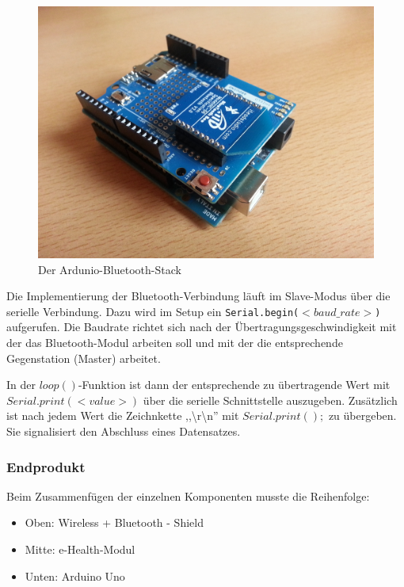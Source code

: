 \documentclass[10pt, a4paper, oneside, titlepage]{scrartcl} %
\begin{document}
	\begin{figure}[hbtp]
	\centering
	\includegraphics[scale=0.1]{img/Arduino+Wireless-Shield.jpg}
	\caption{Der Ardunio-Bluetooth-Stack}
	\label{fig:Arduino-Bluetooth-Stack}
	\end{figure}
	
	Die Implementierung der Bluetooth-Verbindung läuft im Slave-Modus über die serielle Verbindung. Dazu wird im Setup ein \texttt{Serial.begin($<baud\_rate>$)} aufgerufen. Die Baudrate richtet sich nach der Übertragungsgeschwindigkeit mit der das Bluetooth-Modul arbeiten soll und mit der die entsprechende Gegenstation (Master) arbeitet. 
	
	In der $loop()$-Funktion ist dann der entsprechende zu übertragende Wert mit \\$Serial.print(<value>)$ über die serielle Schnittstelle auszugeben. Zusätzlich ist nach jedem Wert die Zeichnkette ,,\textbackslash r\textbackslash n'' mit $Serial.print();$ zu übergeben. Sie signalisiert den Abschluss eines Datensatzes.
	
	
	\subsubsection{Endprodukt}

	Beim Zusammenfügen der einzelnen Komponenten musste die Reihenfolge:
	\begin{itemize}
	\item Oben: Wireless + Bluetooth - Shield
	\item Mitte: e-Health-Modul
	\item Unten: Arduino Uno
	\end{itemize}
	
\end{document}
